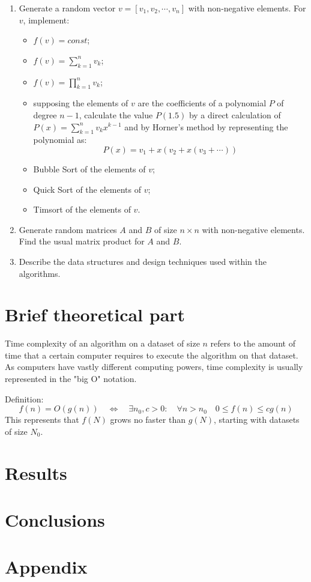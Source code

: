 \documentclass[12pt, a4paper]{article}
\begin{document}
\begin{enumerate}
\item Generate a random vector $v = [v_1, v_2, \cdots, v_n]$ with non-negative elements. For $v$, implement:
	\begin{itemize}
	\item $f(v) = const$;
	\item $f(v) = \sum_{k=1}^n v_k$;
	\item $f(v) = \prod_{k=1}^n v_k$;
	\item supposing the elements of $v$ are the coefficients of a polynomial $P$ of degree $n-1$, calculate the value $P(1.5)$ by a direct calculation of $P(x) = \sum_{k=1}^n v_k x^{k-1}$ and by Horner's method by representing the polynomial as:
		\[ P(x) = v_1 + x(v_2 + x(v_3 + \cdots)) \]
	\item Bubble Sort of the elements of $v$;
	\item Quick Sort of the elements of $v$;
	\item Timsort of the elements of $v$.
	\end{itemize}
\item Generate random matrices $A$ and $B$ of size $n\times n$ with non-negative elements. Find the usual matrix product for $A$ and $B$.
\item Describe the data structures and design techniques used within the algorithms.
\end{enumerate}

\section*{Brief theoretical part}

Time complexity of an algorithm on a dataset of size $n$ refers to the amount of time that a certain computer requires to execute the algorithm on that dataset. As computers have vastly different computing powers, time complexity is usually represented in the "big O" notation.

Definition:
\[ f(n) = O(g(n)) \quad\Leftrightarrow\quad \exists n_0, c>0: \quad \forall n>n_0 \quad 0 \leq f(n) \leq cg(n) \]
This represents that $f(N)$ grows no faster than $g(N)$, starting with datasets of size $N_0$.

\section*{Results}


\section*{Conclusions}

\section*{Appendix}
\end{document}
